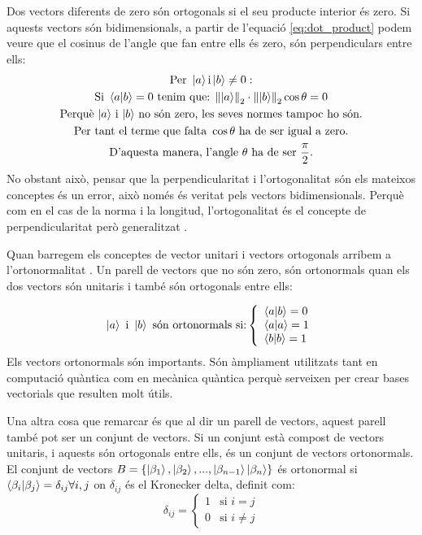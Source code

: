 Dos vectors diferents de zero són ortogonals si el seu producte interior és zero. Si aquests vectors són bidimensionals, a partir de l'equació \eqref{eq:dot_product} podem veure que el cosinus de l'angle que fan entre ells és zero, són perpendiculars entre ells:
\begin{multline*}
	 \text{Per }\ket{a} \text{i} \ket{b}\neq 0 : \\
	\text{Si }\bra{a}\ket{b} = 0 \text{ tenim que: } \norm{\ket{a}}_2 \cdot \norm{\ket{b}}_2 \cos \theta = 0 \\
	 \text{Perquè $\ket{a}$ i $\ket{b}$ no són zero, les seves normes tampoc ho són.} \\
	 \text{Per tant el terme que falta } \cos\theta \text{ ha de ser igual a zero.} \\
	 \text{D'aquesta manera, l'angle $\theta$ ha de ser } \frac{\pi}{2}. \\
\end{multline*}
No obstant això, pensar que la perpendicularitat i l'ortogonalitat són els mateixos conceptes és un error, això només és veritat pels vectors bidimensionals. Perquè com en el cas de la norma i la longitud, l'ortogonalitat és el concepte de perpendicularitat però generalitzat \cite{LR_done_right:norm}.

Quan barregem els conceptes de vector unitari i vectors ortogonals arribem a l'ortonormalitat \cite{QCandQI:GramSchmidt}. Un parell de vectors que no són zero, són ortonormals quan els dos vectors són unitaris i també són ortogonals entre ells:

$$
\ket{a} \text{ i } \ket{b} \text{ són ortonormals si:} \left\{
	\begin{array}{ll}
		\bra{a}\ket{b} = 0 \\
		\bra{a}\ket{a} = 1 \\
		\bra{b}\ket{b} = 1 \\
	\end{array}
\right.
$$
Els vectors ortonormals són importants. Són àmpliament utilitzats tant en computació quàntica com en mecànica quàntica perquè serveixen per crear bases vectorials que resulten molt útils.

Una altra cosa que remarcar és que al dir un parell de vectors, aquest parell també pot ser un conjunt de vectors. Si un conjunt està compost de vectors unitaris, i aquests són ortogonals entre ells, és un conjunt de vectors ortonormals.
El conjunt de vectors $ B = \{\ket{\beta_1}, \ket{\beta_2}, ..., \ket{\beta_{n-1}} \ket{\beta_n}\} $ és ortonormal si $\bra{\beta_i}\ket{\beta_j} = \delta_{ij}  \forall i, j$ \cite{QCandQI:GramSchmidt} on $\delta_{ij}$ és el Kronecker delta, definit com:
$$
\delta_{ij} =
\begin{cases}
	1 &\text{si } i=j\\
	0 &\text{si } i\neq j
\end{cases}
$$

